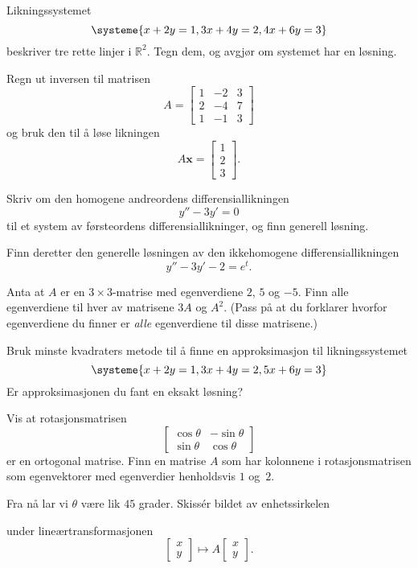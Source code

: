 \documentclass[titlepage,a4paper,12pt,norsk]{IMFeksamen}
\newcommand{\V}[1]{\mathbf{#1}}
\newcommand{\vv}[2]{\begin{bmatrix} #1 \\ #2 \end{bmatrix}}
\newcommand{\vvv}[3]{\begin{bmatrix} #1 \\ #2 \\ #3 \end{bmatrix}}
\newcommand{\x}{\V{x}}
\newcommand{\0}{\V{0}}
\begin{document}
\begin{oppgave}
Likningssystemet 
\[
\systeme{
x + 2y = 1,
3x + 4y = 2,
4x + 6y = 3
}
\]
beskriver tre rette linjer i $\mathbb R^2$. Tegn dem, og avgjør om systemet har en løsning.
\end{oppgave}


\begin{oppgave}
Regn ut inversen til matrisen
\[
A =
\begin{bmatrix}
1 & -2 & 3 \\
2 & -4 & 7 \\
1 & -1 & 3
\end{bmatrix}
\]
og bruk den til å løse likningen
\[
A \x = \vvv{1}{2}{3}.
\]
\end{oppgave}


\begin{oppgave}
Skriv om den homogene andreordens differensiallikningen
\[
y''-3y'= 0
\]
til et system av førsteordens differensiallikninger,
og finn generell løsning.

Finn deretter den generelle løsningen av den ikkehomogene
differensiallikningen
\[
y''-3y'-2 = e^t.
\]
\end{oppgave}


\begin{oppgave}
Anta at $A$ er en $3 \times 3$-matrise med egenverdiene $2$, $5$ og $-5$.
Finn alle egenverdiene til hver av matrisene $3A$ og $A^2$.
(Pass på at du forklarer hvorfor egenverdiene du finner er \emph{alle} egenverdiene
til disse matrisene.)
\end{oppgave}


\begin{oppgave}
Bruk minste kvadraters metode til å finne en approksimasjon til likningssystemet
\[
\systeme{
x + 2y = 1,
3x + 4y = 2,
5x + 6y = 3
}
\]
Er approksimasjonen du fant en eksakt løsning?
\end{oppgave}


\begin{oppgave}
Vis at rotasjonsmatrisen 
\[
\begin{bmatrix}
\cos \theta  & -\sin \theta  \\  \sin \theta & \cos \theta 
\end{bmatrix}
\]
er en ortogonal matrise.
Finn en matrise $A$ som har kolonnene i rotasjonsmatrisen som egenvektorer
med egenverdier henholdsvis $1$ og~$2$.

Fra nå lar vi $\theta$ være lik $45$ grader. Skissér bildet av enhetssirkelen
\begin{center}
\end{center}
under lineærtransformasjonen
\[
\vv{x}{y}\mapsto A\vv{x}{y}.
\]
\end{oppgave}
\end{document}

